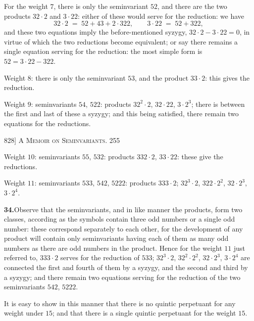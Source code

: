 \documentclass[11pt]{article}
\begin{document}
\medskip
For the weight $7$, there is only the seminvariant $52$, and there are the two
products $32\cdot 2$ and $3\cdot 22$: either of these would serve for the reduction:
we have
\[
32\cdot 2 \;=\; 52 + 43 + 2\cdot 322,\qquad 3\cdot 22 \;=\; 52 + 322,
\]
and these two equations imply the before-mentioned syzygy, $32\cdot 2-3\cdot 22=0$, in
virtue of which the two reductions become equivalent; or say there remains a single
equation serving for the reduction: the most simple form is $52=3\cdot 22-322$.

\medskip
Weight $8$: there is only the seminvariant $53$, and the product $33\cdot 2$: this
gives the reduction.

\medskip
Weight $9$: seminvariants $54$, $522$: products $32^{2}\cdot 2$, $32\cdot 22$, $3\cdot 2^{3}$;
there is between the first and last of these a syzygy; and this being satisfied,
there remain two equations for the reductions.

\newpage
\noindent\textsc{828] \hfill A Memoir on Seminvariants. \hfill 255}
\vspace{0.6em}

\medskip
Weight $10$: seminvariants $55$, $532$: products $332\cdot 2$, $33\cdot 22$: these
give the reductions.

\medskip
Weight $11$: seminvariants $533$, $542$, $5222$: products $333\cdot 2$; $32^{3}\cdot 2$,
$322\cdot 2^{2}$, $32\cdot 2^{3}$, $3\cdot 2^{4}$.

\medskip
\noindent\textbf{34.}\quad Observe that the seminvariants, and in like manner the
products, form two classes, according as the symbols contain three odd numbers or a
single odd number: these correspond separately to each other, for the development of
any product will contain only seminvariants having each of them as many odd numbers
as there are odd numbers in the product. Hence for the weight $11$ just referred to,
$333\cdot 2$ serves for the reduction of $533$; $32^{3}\cdot 2$, $32^{2}\cdot 2^{2}$,
$32\cdot 2^{3}$, $3\cdot 2^{4}$ are connected the first and fourth of them by a syzygy,
and the second and third by a syzygy; and there remain two equations serving for the
reduction of the two seminvariants $542$, $5222$.

\medskip
It is easy to show in this manner that there is no quintic perpetuant for any weight
under $15$; and that there is a single quintic perpetuant for the weight $15$.
\end{document}
